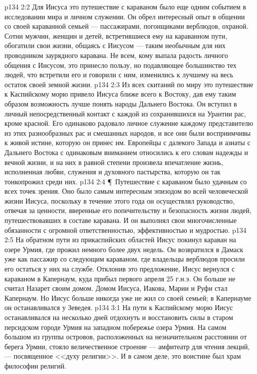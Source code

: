 \vs p134 2:2 Для Иисуса это путешествие с караваном было еще одним событием в исследовании мира и личном служении. Он обрел интересный опыт в общении со своей караванной семьей --- пассажирами, погонщиками верблюдов, охраной. Сотни мужчин, женщин и детей, встретившиеся ему на караванном пути, обогатили свои жизни, общаясь с Иисусом --- таким необычным для них проводником заурядного каравана. Не всем, кому выпала радость личного общения с Иисусом, это принесло пользу, но подавляющее большинство тех людей, что встретили его и говорили с ним, изменились к лучшему на весь остаток своей земной жизни.
\vs p134 2:3 Из всех скитаний по миру это путешествие к Каспийскому морю привело Иисуса ближе всего к Востоку, дав ему таким образом возможность лучше понять народы Дальнего Востока. Он вступил в личный непосредственный контакт с каждой из сохранившихся на Урантии рас, кроме красной. Его одинаково радовало личное служение каждому представителю из этих разнообразных рас и смешанных народов, и все они были восприимчивы к живой истине, которую он принес им. Европейцы с далекого Запада и азиаты с Дальнего Востока с одинаковым вниманием относились к его словам надежды и вечной жизни, и на них в равной степени произвела впечатление жизнь, исполненная любви, служения и духовного пастырства, которую он так тонкопрожил среди них.
\vs p134 2:4 \P\ Путешествие с караваном было удачным со всех точек зрения. Оно было самым интересным эпизодом во всей человеческой жизни Иисуса, поскольку в течение этого года он осуществлял руководство, отвечая за ценности, вверенные его попечительству и безопасность жизни людей, путешествовавших в составе каравана. И он выполнял свои многочисленные обязанности с огромной ответственностью, эффективностью и мудростью.
\vs p134 2:5 На обратном пути из прикаспийских областей Иисус покинул караван на озере Урмия, где прожил немного более двух недель. Он возвратился в Дамаск уже как пассажир со следующим караваном, где владельцы верблюдов просили его остаться у них на службе. Отклонив это предложение, Иисус вернулся с караваном в Капернаум, куда прибыл первого апреля 25 г.н.э. Он больше не считал Назарет своим домом. Домом Иисуса, Иакова, Марии и Руфи стал Капернаум. Но Иисус больше никогда уже не жил со своей семьей; в Капернауме он останавливался у Зеведея.
\vs p134 3:1 На пути к Каспийскому морю Иисус останавливался на несколько дней отдохнуть и восстановить силы в старом персидском городе Урмия на западном побережье озера Урмия. На самом большом из группы островов, расположенных на незначительном расстоянии от берега Урмии, стояло величественное строение --- амфитеатр для чтения лекций, --- посвященное <<духу религии>>. И в самом деле, это воистине был храм философии религий.
